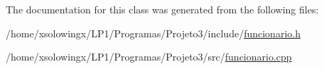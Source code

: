 The documentation for this class was generated from the following files\+:\begin{DoxyCompactItemize}
\item 
/home/xsolowingx/\+L\+P1/\+Programas/\+Projeto3/include/\hyperlink{funcionario_8h}{funcionario.\+h}\item 
/home/xsolowingx/\+L\+P1/\+Programas/\+Projeto3/src/\hyperlink{funcionario_8cpp}{funcionario.\+cpp}\end{DoxyCompactItemize}
